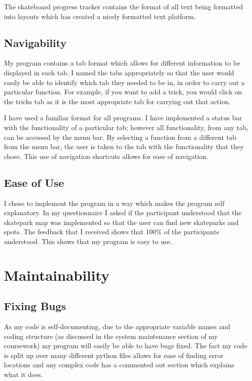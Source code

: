 The skateboard progress tracker contains the format of all text being formatted into layouts which has created a nicely formatted text platform. 

	\subsection{Navigability}

My program contains a tab format which allows for different information to be displayed in each tab. I named the tabs appropriately so that the user would easily be able to identify which tab they needed to be in, in order to carry out a particular function. For example, if you want to add a trick, you would click on the tricks tab as it is the most appropriate tab for carrying out that action.

I have used a familiar format for all programs. I have implemented a status bar with the functionality of a particular tab; however all functionality, from any tab, can be accessed by the menu bar. By selecting a function from a different tab from the menu bar, the user is taken to the tab with the functionality that they chose. This use of navigation shortcuts allows for ease of navigation.

	\subsection{Ease of Use}

I chose to implement the program in a way which makes the program self explanatory. In my questionnaire I asked if the participant understood that the skatepark map was implemented so that the user can find new skateparks and spots. The feedback that I received shows that 100\% of the participants understood. This shows that my program is easy to use.

\section{Maintainability}

	\subsection{Fixing Bugs}

As my code is self-documenting, due to the appropriate variable names and coding structure (as discussed in the system maintenance section of my coursework) my program will easily be able to have bugs fixed. The fact my code is split up over many different python files allows for ease of finding error locations and any complex code has a commented out section which explains what it does.


